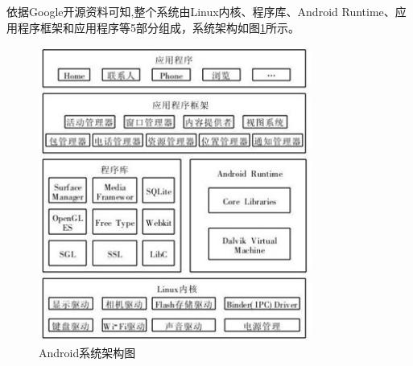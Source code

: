 \documentclass{XDBAthesis}
\begin{document}
    依据Google开源资料可知,整个系统由Linux内核、程序库、Android Runtime、应用程序框架和应用程序等5部分组成，系统架构如图\ref{fg:android}所示。
\begin{figure}[htb]
    \centering
    \includegraphics[width=0.8\textwidth]{figure/android}
    \caption{Android系统架构图}
    \label{fg:android}        
\end{figure}
    
\end{document}
